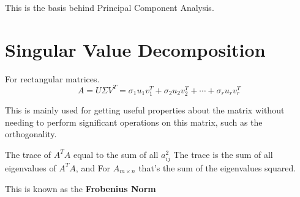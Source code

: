 \documentclass[twoside]{report}
\begin{document}
This is the basis behind Principal Component Analysis.
\section{Singular Value Decomposition}
For rectangular matrices.
\[ 
	A = U \Sigma V^T  = \sigma_1 u_1 v_1^T + \sigma_2u_2v_2^T + \cdots + \sigma_r u_r v_r^T
\]

This is mainly used for getting useful properties about the matrix without needing to perform significant operations on this matrix, such as the orthogonality.

	
\begin{note}
	The trace of $A^TA$ equal to the sum of all $a_{ij}^2$
	The trace is the sum of all eigenvalues of $A^T A$, and For $A_{m \times n}$ that's the sum of the eigenvalues squared.

	This is known as the \textbf{Frobenius Norm}
\end{note}
\end{document}
